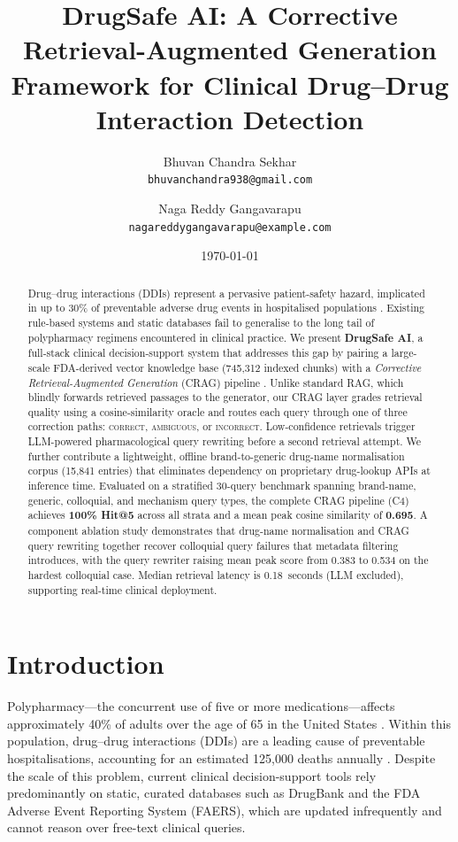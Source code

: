 \documentclass[10pt, twocolumn]{article}
\title{\textbf{DrugSafe AI: A Corrective Retrieval-Augmented Generation
Framework for Clinical Drug--Drug Interaction Detection}}
\author{
  Bhuvan Chandra Sekhar\\
  \small\texttt{bhuvanchandra938@gmail.com}
  \and
  Naga Reddy Gangavarapu\\
  \small\texttt{nagareddygangavarapu@example.com}
}
\date{\today}
\begin{document}
\maketitle

\begin{abstract}
Drug--drug interactions (DDIs) represent a pervasive patient-safety
hazard, implicated in up to 30\% of preventable adverse drug events in
hospitalised populations \cite{who2016}.  Existing rule-based systems
and static databases fail to generalise to the long tail of polypharmacy
regimens encountered in clinical practice.  We present \textbf{DrugSafe
AI}, a full-stack clinical decision-support system that addresses this
gap by pairing a large-scale FDA-derived vector knowledge base (745,312
indexed chunks) with a \emph{Corrective Retrieval-Augmented Generation}
(CRAG) pipeline \cite{yan2024crag}.  Unlike standard RAG, which blindly
forwards retrieved passages to the generator, our CRAG layer grades
retrieval quality using a cosine-similarity oracle and routes each query
through one of three correction paths: \textsc{correct},
\textsc{ambiguous}, or \textsc{incorrect}.  Low-confidence retrievals
trigger LLM-powered pharmacological query rewriting before a second
retrieval attempt.  We further contribute a lightweight, offline
brand-to-generic drug-name normalisation corpus (15,841 entries) that
eliminates dependency on proprietary drug-lookup APIs at inference time.
Evaluated on a stratified 30-query benchmark spanning brand-name,
generic, colloquial, and mechanism query types, the complete CRAG
pipeline (C4) achieves \textbf{100\% Hit@5} across all strata and a
mean peak cosine similarity of \textbf{0.695}.  A component ablation
study demonstrates that drug-name normalisation and CRAG query rewriting
together recover colloquial query failures that metadata filtering
introduces, with the query rewriter raising mean peak score from 0.383 to
0.534 on the hardest colloquial case.  Median retrieval latency is
0.18~seconds (LLM excluded), supporting real-time clinical deployment.
\end{abstract}

\section{Introduction}
\label{sec:intro}

Polypharmacy—the concurrent use of five or more medications—affects
approximately 40\% of adults over the age of 65 in the United States
\cite{masnoon2017polypharmacy}.  Within this population, drug--drug
interactions (DDIs) are a leading cause of preventable hospitalisations,
accounting for an estimated 125,000 deaths annually \cite{who2016}.
Despite the scale of this problem, current clinical decision-support
tools rely predominantly on static, curated databases such as DrugBank
\cite{wishart2018drugbank} and the FDA Adverse Event Reporting System
(FAERS), which are updated infrequently and cannot reason over free-text
clinical queries.
\end{document}
